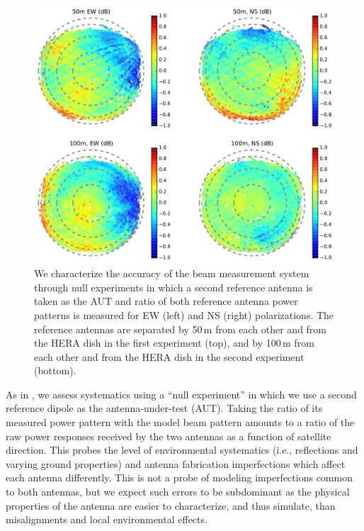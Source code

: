 \documentclass{emulateapj}
\begin{document}
\begin{figure}[h]
\centering
\includegraphics[width=6.5in]{null_expt_rel_beam_maps.pdf}
\caption{We characterize the accuracy of the beam measurement system through null experiments in which a second reference antenna is taken as the AUT and ratio of both reference antenna power patterns is measured for EW (left) and NS (right) polarizations. The reference antennas are separated by 50\,m from each other and from the HERA dish in the first experiment (top), and by 100\,m from each other and from the HERA dish in the second experiment (bottom).}
\label{fig:nullexptplots}
\end{figure}

As in \citet{neben15}, we assess systematics using a ``null experiment'' in which we use a second reference dipole as the antenna-under-test (AUT). Taking the ratio of its measured power pattern with the model beam pattern amounts to a ratio of the raw power responses received by the two antennas as a function of satellite direction. This probes the level of environmental systematics (i.e., reflections and varying ground properties) and antenna fabrication imperfections which affect each antenna differently. This is not a probe of modeling imperfections common to both antennas, but we expect such errors to be subdominant as the physical properties of the antenna are easier to characterize, and thus simulate, than misalignments and local environmental effects. 
\end{document}
